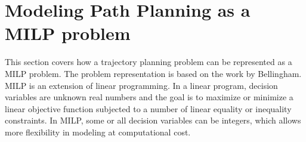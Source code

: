 \section{Modeling Path Planning as a MILP problem}
This section covers how a trajectory planning problem can be represented as a MILP problem. The problem representation is based on the work by Bellingham\cite{Bellingham2002}.
MILP is an extension of linear programming. In a linear program, decision variables are unknown real numbers and the goal is to maximize or minimize a linear objective function subjected to a number of linear equality or inequality constraints. In MILP, some or all decision variables can be integers, which allows more flexibility in modeling at computational cost.

